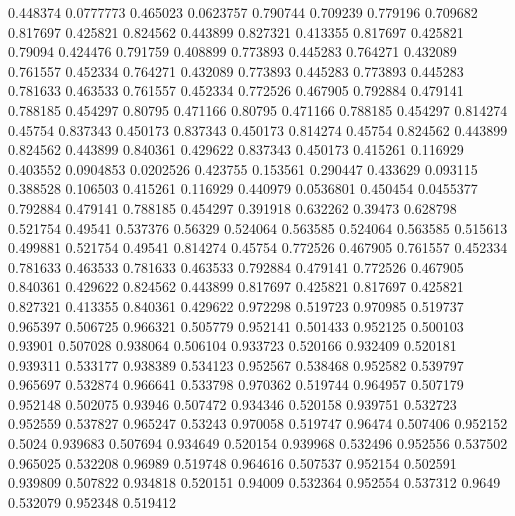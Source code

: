 0.448374 0.0777773
0.465023 0.0623757
0.790744 0.709239
0.779196 0.709682
0.817697 0.425821
0.824562 0.443899
0.827321 0.413355
0.817697 0.425821
0.79094 0.424476
0.791759 0.408899
0.773893 0.445283
0.764271 0.432089
0.761557 0.452334
0.764271 0.432089
0.773893 0.445283
0.773893 0.445283
0.781633 0.463533
0.761557 0.452334
0.772526 0.467905
0.792884 0.479141
0.788185 0.454297
0.80795 0.471166
0.80795 0.471166
0.788185 0.454297
0.814274 0.45754
0.837343 0.450173
0.837343 0.450173
0.814274 0.45754
0.824562 0.443899
0.824562 0.443899
0.840361 0.429622
0.837343 0.450173
0.415261 0.116929
0.403552 0.0904853
0.0202526 0.423755
0.153561 0.290447
0.433629 0.093115
0.388528 0.106503
0.415261 0.116929
0.440979 0.0536801
0.450454 0.0455377
0.792884 0.479141
0.788185 0.454297
0.391918 0.632262
0.39473 0.628798
0.521754 0.49541
0.537376 0.56329
0.524064 0.563585
0.524064 0.563585
0.515613 0.499881
0.521754 0.49541
0.814274 0.45754
0.772526 0.467905
0.761557 0.452334
0.781633 0.463533
0.781633 0.463533
0.792884 0.479141
0.772526 0.467905
0.840361 0.429622
0.824562 0.443899
0.817697 0.425821
0.817697 0.425821
0.827321 0.413355
0.840361 0.429622
0.972298 0.519723
0.970985 0.519737
0.965397 0.506725
0.966321 0.505779
0.952141 0.501433
0.952125 0.500103
0.93901 0.507028
0.938064 0.506104
0.933723 0.520166
0.932409 0.520181
0.939311 0.533177
0.938389 0.534123
0.952567 0.538468
0.952582 0.539797
0.965697 0.532874
0.966641 0.533798
0.970362 0.519744
0.964957 0.507179
0.952148 0.502075
0.93946 0.507472
0.934346 0.520158
0.939751 0.532723
0.952559 0.537827
0.965247 0.53243
0.970058 0.519747
0.96474 0.507406
0.952152 0.5024
0.939683 0.507694
0.934649 0.520154
0.939968 0.532496
0.952556 0.537502
0.965025 0.532208
0.96989 0.519748
0.964616 0.507537
0.952154 0.502591
0.939809 0.507822
0.934818 0.520151
0.94009 0.532364
0.952554 0.537312
0.9649 0.532079
0.952348 0.519412
